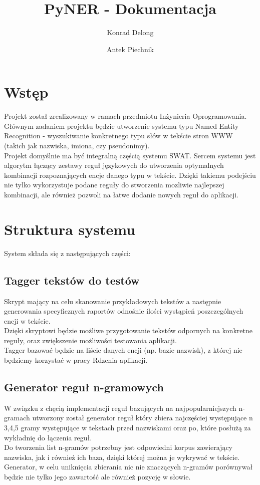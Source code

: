\documentclass[12pt]{article}
\author{Konrad Delong \and Antek Piechnik}
\title{PyNER - Dokumentacja}
\begin{document}
\maketitle
\tableofcontents
\newpage

\section{Wstęp}
Projekt został zrealizowany w ramach przedmiotu Inżynieria Oprogramowania. Głównym zadaniem projektu będzie utworzenie systemu typu Named Entity Recognition - wyszukiwanie konkretnego typu słów w tekście stron WWW (takich jak nazwiska, imiona, czy pseudonimy).
\\Projekt domyślnie ma być integralną częścią systemu SWAT. Sercem systemu jest algorytm łączący zestawy reguł językowych do utworzenia optymalnych kombinacji rozpoznających encje danego typu w tekście. Dzięki takiemu podejściu nie tylko wykorzystuje podane reguły do stworzenia mozliwie najlepszej kombinacji, ale również pozwoli na łatwe dodanie nowych reguł do aplikacji.

\section{Struktura systemu}
System składa się z następujących części:

\subsection{Tagger tekstów do testów}
Skrypt mający na celu skanowanie przykładowych tekstów a następnie generowania specyficznych raportów odnośnie ilości wystąpień poszczególnych encji w tekście.
\\Dzięki skryptowi będzie możliwe przygotowanie tekstów odpornych na konkretne reguły, oraz zwiększenie możliwości testowania aplikacji.
\\Tagger bazować będzie na liście danych encji (np. bazie nazwisk), z której nie będziemy korzystać w pracy Rdzenia aplikacji.

\subsection{Generator reguł n-gramowych}
W związku z chęcią implementacji reguł bazujących na najpopularniejszych n-gramach utworzony został generator reguł który zbiera najczęściej występujące n {3,4,5} gramy występujące w tekstach przed nazwiskami oraz po, które posłużą za wykładnię do łączenia reguł.
\\Do tworzenia list n-gramów potrzebny jest odpowiedni korpus zawierający nazwiska, jak i również ich baza, dzięki której można je wykrywać w tekście.
\\Generator, w celu uniknięcia zbierania nic nie znaczących n-gramów porównywał będzie nie tylko jego zawartość ale również pozycję w słowie.
\end{document}
